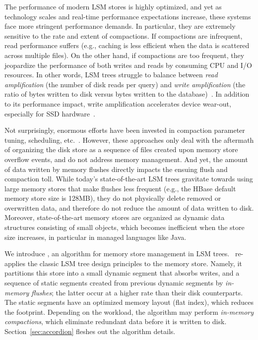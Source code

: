 The performance of modern LSM stores is highly optimized, and yet as technology scales and real-time 
performance expectations increase, these systems face more stringent performance demands. In particular, 
they are extremely sensitive to the rate and extent of compactions. If compactions are infrequent, read performance
suffers (e.g., caching is less efficient when the data is scattered across multiple files). On the other hand, if 
compactions are too frequent, they jeopardize the performance of both writes and reads by consuming CPU 
and I/O resources. In other words, LSM trees struggle to balance between {\em read amplification} (the number 
of disk reads per query) and {\em write amplification} (the ratio of bytes written to disk versus bytes written to the 
database)~\cite{rocksdbtuning}. In addition to its performance impact, write amplification accelerates device wear-out, 
especially for SSD hardware~\cite{Hu:2009}. 

Not surprisingly, enormous efforts have been invested in compaction parameter tuning, scheduling, etc.~\cite{hbasetuning,
universalcompaction,scylladbcompaction,Sears:2012}. However, these approaches only deal with the aftermath
of organizing the disk store as a sequence of files created upon memory store overflow events, and do not 
address memory management. And yet, the amount of data written by memory flushes  
directly impacts the ensuing flush and compaction toll. 
While today's state-of-the-art LSM trees gravitate towards using large memory 
stores that make flushes less frequent (e.g., the HBase default memory store size is 128MB), 
they do not physically delete removed or overwritten data,
and therefore do not reduce the amount of data written to disk.
Moreover, state-of-the-art memory stores are organized as dynamic data structures consisting of small objects,
which becomes inefficient when the store size increases, in particular in managed languages like Java. 

We introduce \sys, an algorithm for memory store management in LSM trees. 
\sys\ re-applies the classic LSM tree design principles to the memory store. Namely, it partitions this store
 into a small dynamic segment that absorbs writes, and a sequence of static segments created 
 from previous dynamic segments by \emph{in-memory flushes}; the latter occur at a higher rate
 than their disk counterparts.  The static segments have an optimized memory
 layout (flat index), which reduces the footprint. Depending on the workload, the algorithm may 
 perform \emph{in-memory compactions}, which eliminate redundant %
 data before it is written to disk. Section~\ref{sec:accordion} fleshes out the algorithm details. 

